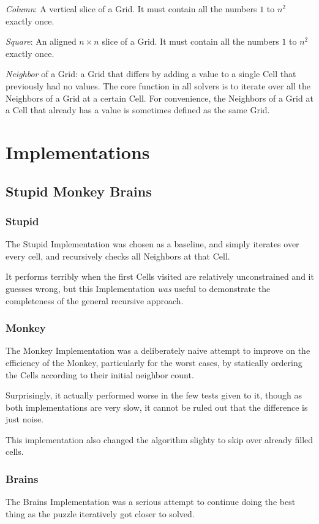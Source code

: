 \documentclass[letterpaper]{article}
\begin{document}
\emph{Column}: A vertical slice of a Grid. It must contain all the
numbers $ 1 $ to $ n^2 $ exactly once.

\emph{Square}: An aligned $ n \times n $ slice of a Grid. It must contain
all the numbers $ 1 $ to $ n^2 $ exactly once.

\emph{Neighbor} of a Grid: a Grid that differs by adding a value to a
single Cell that previously had no values. The core function in all
solvers is to iterate over all the Neighbors of a Grid at a certain Cell.
For convenience, the Neighbors of a Grid at a Cell that already has a value
is sometimes defined as the same Grid.

\section{Implementations}

\subsection{Stupid Monkey Brains}

\subsubsection{Stupid}
The Stupid Implementation was chosen as a baseline, and simply iterates
over every cell, and recursively checks all Neighbors at that Cell.

It performs terribly when the first Cells visited are relatively
unconstrained and it guesses wrong, but this Implementation \emph{was}
useful to demonstrate the completeness of the general recursive approach.

\subsubsection{Monkey}
The Monkey Implementation was a deliberately naive attempt to improve on
the efficiency of the Monkey, particularly for the worst cases, by
statically ordering the Cells according to their initial neighbor count.

Surprisingly, it actually performed worse in the few tests given to it,
though as both implementations are very slow, it cannot be ruled out that
the difference is just noise.

This implementation also changed the algorithm slighty to skip over
already filled cells.

\subsubsection{Brains}
The Brains Implementation was a serious attempt to continue doing the best
thing as the puzzle iteratively got closer to solved.
\end{document}
